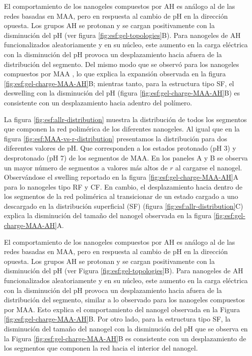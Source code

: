 El comportamiento de los nanogeles compuestos por AH es an\'alogo al de las redes basadas en MAA, pero en respuesta al cambio de pH en la direcci\'on opuesta.
Los grupos AH se protonan y se cargan positivamente con la disminuci\'on del pH (ver figura \ref{fig:esf:gel-topologies}B).
Para nanogeles de AH funcionalizados aleatoriamente y en su n\'ucleo, este aumento en la carga el\'ectrica con la disminuci\'on del pH provoca un desplazamiento hacia afuera de la distribuci\'on del segmento. Del mismo modo que se observ\'o para los nanogeles compuestos por MAA%
, lo que explica la expansi\'on observada en la figura \ref{fig:esf:gel-charge-MAA-AH}B;
mientras tanto, para la estructura tipo SF, el deswelling con la disminuci\'on del pH (figura \ref{fig:esf:gel-charge-MAA-AH}B) es consistente con un desplazamiento hacia adentro del pol\'imero. %


La figura \ref{fig:esf:allr-distribution} muestra la distribuci\'on de todos los segmentos que componen la red polim\'erica de los diferentes nanogeles. 
Al igual que en la figura \ref{fig:esf:MAA-vs-r-distribution} presentamos la distribuci\'on para dos diferentes valores de pH. Que corresponden a los estados protonado (pH 3) y desprotonado (pH 7) de los segmentos de MAA.  En los paneles A y B se observa un mayor n\'umero de segmentos a valores m\'as altos de $r$ al cargarse el nanogel. Observ\'andose el swelling reportado en la figura \ref{fig:esf:gel-charge-MAA-AH}A para lo nanogeles tipo RF y CF.
En cambio, el desplazamiento hacia dentro de los segmentos de la red polim\'erica al transicionar de un estado cargado a uno descargado en la distribuci\'on superficial (SF) (figura \ref{fig:esf:allr-distribution}C) explica la disminuci\'on del tama\~no del nanogel observada en la figura \ref{fig:esf:gel-charge-MAA-AH}A.

El comportamiento de los nanogeles compuestos por AH es an\'alogo al de las redes basadas en MAA, pero en respuesta al cambio de pH en la direcci\'on opuesta. Los grupos AH se protonan y se cargan positivamente con la disminuci\'on del pH (ver Figura \ref{fig:esf:gel-topologies}B). Para nanogeles de AH funcionalizados aleatoriamente y en su n\'ucleo, este aumento en la carga el\'ectrica con la disminuci\'on del pH provoca un desplazamiento hacia afuera de la distribuci\'on del segmento, similar a lo observado para los nanogeles compuestos por MAA. Esto explica el comportamiento del nanogel  observada en la Figura \ref{fig:esf:gel-charge-MAA-AH}B. Por otro lado, para la estructura tipo SF, la disminuci\'on del tama\~no del nanogel  con la disminuci\'on del pH que se observa en la Figura \ref{fig:esf:gel-charge-MAA-AH}B es consistente con un desplazamiento de los segmentos que componen la red hacia el interior del nanogel.%

